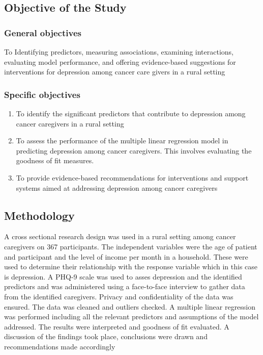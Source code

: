 \documentclass[11pt]{article}\usepackage[]{graphicx}\usepackage[]{xcolor}
\numberwithin{equation}{section}
\numberwithin{table}{section}
\begin{document}
\subsection{Objective of the Study}
\subsubsection{General objectives}
To Identifying predictors, measuring associations, examining interactions, evaluating model performance, and offering evidence-based suggestions for interventions for depression among cancer care givers in a rural setting
\subsubsection{Specific objectives}
\begin{enumerate}
\item To identify the significant predictors that contribute to depression among cancer caregivers in a rural setting
\item To assess the performance of the multiple linear regression model in predicting depression among cancer caregivers. This involves evaluating the goodness of fit measures.
\item To provide evidence-based recommendations for interventions and support systems aimed at addressing depression among cancer caregivers
\end{enumerate}

\subsection{Methodology}
A cross sectional research design was used in a rural setting among cancer caregivers on 367 participants. The independent variables were the age of patient and participant and the level of income per month in a household. These were used to determine their relationship with the response variable which in this case is depression. A PHQ-9 scale was used to asses depression and the identified predictors and was administered using a face-to-face interview to gather data from the identified caregivers. Privacy and confidentiality of the data was ensured. The data was cleaned and outliers checked. A multiple linear regression was performed including all the relevant predictors and assumptions of the model addressed. The results were interpreted and goodness of fit evaluated. A discussion of the findings took place, conclusions were drawn and recommendations made accordingly
\end{document}
